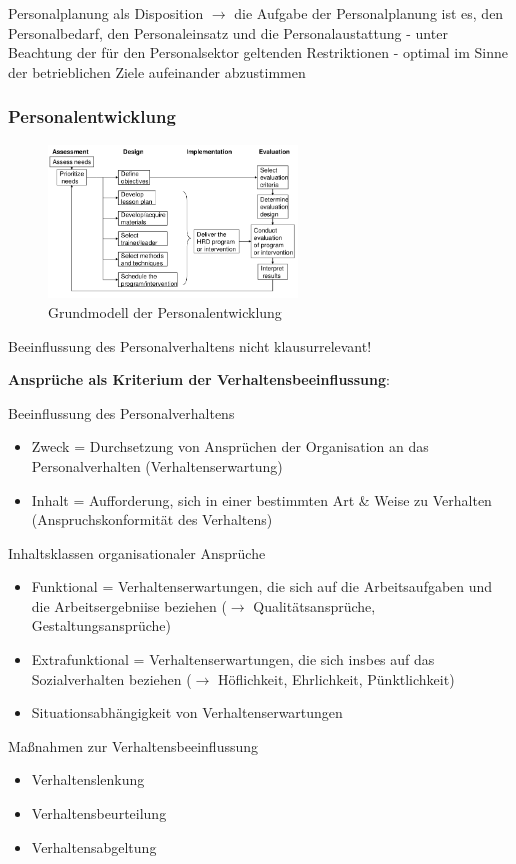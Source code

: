 \documentclass[11pt]{article}
\begin{document}
Personalplanung als Disposition \(\rightarrow\) die Aufgabe der Personalplanung ist es, den Personalbedarf, den Personaleinsatz und die Personalaustattung - unter Beachtung der für den Personalsektor geltenden Restriktionen - optimal im Sinne der betrieblichen Ziele aufeinander abzustimmen
\subsubsection{Personalentwicklung}
\label{sec:orga3653f7}
\begin{figure}[htbp]
\centering
\includegraphics[width=250px]{./pictures/persgruent.png}
\caption{Grundmodell der Personalentwicklung}
\end{figure} 

Beeinflussung des Personalverhaltens nicht klausurrelevant!

\textbf{Ansprüche als Kriterium der Verhaltensbeeinflussung}:

Beeinflussung des Personalverhaltens
\begin{itemize}
\item Zweck = Durchsetzung von Ansprüchen der Organisation an das Personalverhalten (Verhaltenserwartung)
\item Inhalt = Aufforderung, sich in einer bestimmten Art \& Weise zu Verhalten (Anspruchskonformität des Verhaltens)
\end{itemize}

Inhaltsklassen organisationaler Ansprüche
\begin{itemize}
\item Funktional = Verhaltenserwartungen, die sich auf die Arbeitsaufgaben und die Arbeitsergebniise beziehen (\(\rightarrow\) Qualitätsansprüche, Gestaltungsansprüche)
\item Extrafunktional = Verhaltenserwartungen, die sich insbes auf das Sozialverhalten beziehen (\(\rightarrow\) Höflichkeit, Ehrlichkeit, Pünktlichkeit)
\item Situationsabhängigkeit von Verhaltenserwartungen
\end{itemize}

Maßnahmen zur Verhaltensbeeinflussung
\begin{itemize}
\item Verhaltenslenkung
\item Verhaltensbeurteilung
\item Verhaltensabgeltung
\end{itemize}
\end{document}
